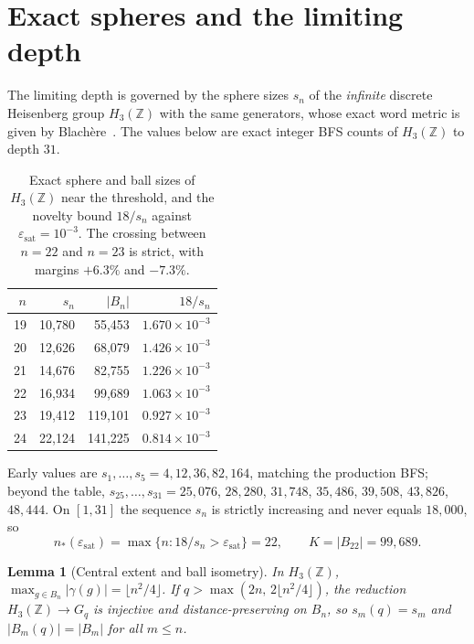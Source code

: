 \documentclass[11pt,a4paper]{article}
\theoremstyle{plain}
\newtheorem{lemma}{Lemma}
\theoremstyle{definition}
\newcommand{\epssat}{\varepsilon_{\mathrm{sat}}}
\begin{document}
  \section{Exact spheres and the limiting depth}
    \label{sec:spheres}

    The limiting depth is governed by the sphere sizes $s_n$ of the \emph{infinite} discrete
    Heisenberg group $H_3(\mathbb{Z})$ with the same generators, whose exact word metric is given
    by Blach\`{e}re~\cite{Blachere2003}.
    The values below are exact integer BFS counts of $H_3(\mathbb{Z})$ to depth $31$.

    \begin{table}[ht]
      \centering
      \caption{Exact sphere and ball sizes of $H_3(\mathbb{Z})$ near the threshold, and the
        novelty bound $18/s_n$ against $\epssat = 10^{-3}$.
        The crossing between $n = 22$ and $n = 23$ is strict, with margins $+6.3\%$ and $-7.3\%$.}
      \label{tab:spheres}
      \begin{tabular}{rrrr}
        \toprule
        $n$ & $s_n$ & $\lvert B_n\rvert$ & $18/s_n$ \\
        \midrule
        19 & 10{,}780 & 55{,}453  & $1.670 \times 10^{-3}$ \\
        20 & 12{,}626 & 68{,}079  & $1.426 \times 10^{-3}$ \\
        21 & 14{,}676 & 82{,}755  & $1.226 \times 10^{-3}$ \\
        22 & 16{,}934 & 99{,}689  & $1.063 \times 10^{-3}$ \\
        23 & 19{,}412 & 119{,}101 & $0.927 \times 10^{-3}$ \\
        24 & 22{,}124 & 141{,}225 & $0.814 \times 10^{-3}$ \\
        \bottomrule
      \end{tabular}
    \end{table}

    Early values are $s_1,\dots,s_5 = 4, 12, 36, 82, 164$, matching the production BFS; beyond the
    table, $s_{25},\dots,s_{31} = 25{,}076$, $28{,}280$, $31{,}748$, $35{,}486$, $39{,}508$,
    $43{,}826$, $48{,}444$.
    On $[1,31]$ the sequence $s_n$ is strictly increasing and never equals $18{,}000$, so
    \begin{equation}
      n_*(\epssat) = \max\{n : 18/s_n > \epssat\} = 22,
      \qquad
      K = \lvert B_{22}\rvert = 99{,}689 .
      \label{eq:nstar}
    \end{equation}

    \begin{lemma}[Central extent and ball isometry]
      \label{lem:isometry}
      In $H_3(\mathbb{Z})$, $\max_{g \in B_n}\lvert\gamma(g)\rvert = \lfloor n^2/4\rfloor$.
      If $q > \max(2n,\, 2\lfloor n^2/4\rfloor)$, the reduction $H_3(\mathbb{Z}) \to G_q$ is
      injective and distance-preserving on $B_n$, so $s_m(q) = s_m$ and
      $\lvert B_m(q)\rvert = \lvert B_m\rvert$ for all $m \le n$.
    \end{lemma}
\end{document}
